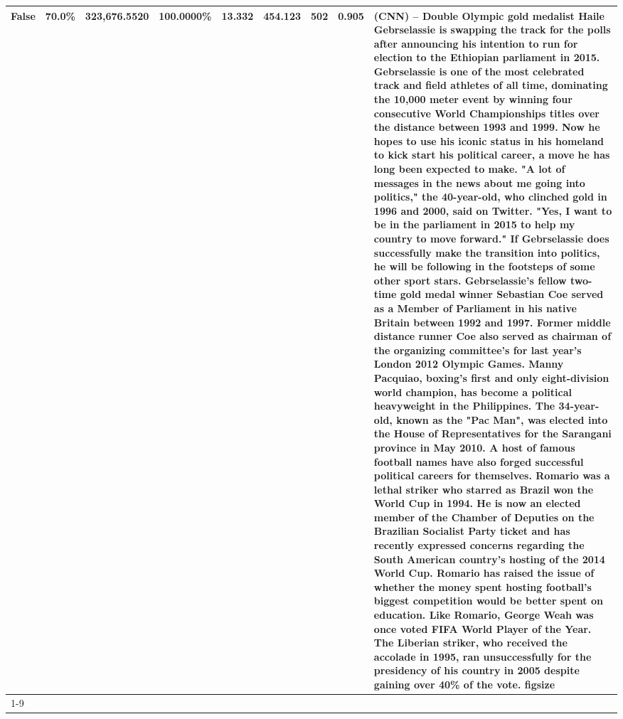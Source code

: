 \begin{table}[H]
{\begin{tabular}{lllrlllll}
False & 70.0\% & 323,676.5520 & \bfseries \color{red} 100.0000\% & 13.332 & 454.123 & 502 & 0.905 & (CNN) -- Double Olympic gold medalist Haile Gebrselassie is swapping the track for the polls after announcing his intention to run for election to the Ethiopian parliament in 2015. Gebrselassie is one of the most celebrated track and field athletes of all time, dominating the 10,000 meter event by winning four consecutive World Championships titles over the distance between 1993 and 1999. Now he hopes to use his iconic status in his homeland to kick start his political career, a move he has long been expected to make. "A lot of messages in the news about me going into politics," the 40-year-old, who clinched gold in 1996 and 2000, said on Twitter. "Yes, I want to be in the parliament in 2015 to help my country to move forward." If Gebrselassie does successfully make the transition into politics, he will be following in the footsteps of some other sport stars. Gebrselassie's fellow two-time gold medal winner Sebastian Coe served as a Member of Parliament in his native Britain between 1992 and 1997. Former middle distance runner Coe also served as chairman of the organizing committee's for last year's London 2012 Olympic Games. Manny Pacquiao, boxing's first and only eight-division world champion, has become a political heavyweight in the Philippines. The 34-year-old, known as the "Pac Man", was elected into the House of Representatives for the Sarangani province in May 2010. A host of famous football names have also forged successful political careers for themselves. Romario was a lethal striker who starred as Brazil won the World Cup in 1994. He is now an elected member of the Chamber of Deputies on the Brazilian Socialist Party ticket and has recently expressed concerns regarding the South American country's hosting of the 2014 World Cup. Romario has raised the issue of whether the money spent hosting football's biggest competition would be better spent on education. Like Romario, George Weah was once voted FIFA World Player of the Year. The Liberian striker, who received the accolade in 1995, ran unsuccessfully for the presidency of his country in 2005 despite gaining over 40\% of the vote. figsize \\
\cline{1-9}

\end{tabular}}
\end{table}
